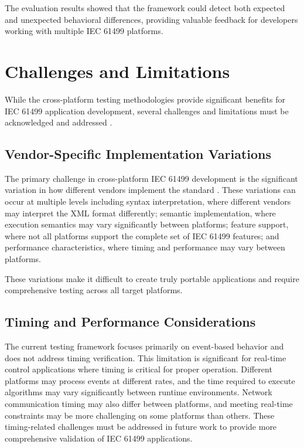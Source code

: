 The evaluation results showed that the framework could detect both expected and unexpected behavioral differences, providing valuable feedback for developers working with multiple IEC 61499 platforms.

\section{Challenges and Limitations}

While the cross-platform testing methodologies provide significant benefits for IEC 61499 application development, several challenges and limitations must be acknowledged and addressed \cite{lyu2020towards}.

\subsection{Vendor-Specific Implementation Variations}

The primary challenge in cross-platform IEC 61499 development is the significant variation in how different vendors implement the standard \cite{sinha2019survey}. These variations can occur at multiple levels including syntax interpretation, where different vendors may interpret the XML format differently; semantic implementation, where execution semantics may vary significantly between platforms; feature support, where not all platforms support the complete set of IEC 61499 features; and performance characteristics, where timing and performance may vary between platforms.

These variations make it difficult to create truly portable applications and require comprehensive testing across all target platforms.

\subsection{Timing and Performance Considerations}

The current testing framework focuses primarily on event-based behavior and does not address timing verification. This limitation is significant for real-time control applications where timing is critical for proper operation. Different platforms may process events at different rates, and the time required to execute algorithms may vary significantly between runtime environments. Network communication timing may also differ between platforms, and meeting real-time constraints may be more challenging on some platforms than others. These timing-related challenges must be addressed in future work to provide more comprehensive validation of IEC 61499 applications.

